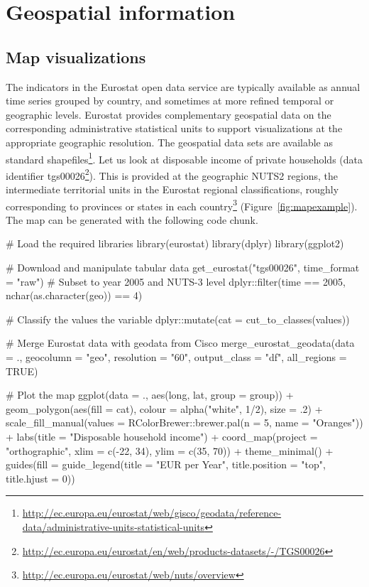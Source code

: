 \section{Geospatial information}

\subsection{Map visualizations}

The indicators in the Eurostat open data service are typically
available as annual time series grouped by country, and sometimes at
more refined temporal or geographic levels. Eurostat provides
complementary geospatial data on the corresponding administrative
statistical units to support visualizations at the appropriate
geographic resolution. The geospatial data sets are available as
standard shapefiles\footnote{\url{http://ec.europa.eu/eurostat/web/gisco/geodata/reference-data/administrative-units-statistical-units}}. Let
us look at disposable income of private households (data identifier
tgs00026\footnote{\url{http://ec.europa.eu/eurostat/en/web/products-datasets/-/TGS00026}}). This is provided at the geographic NUTS2 regions, the intermediate territorial units in the Eurostat regional classifications, roughly
corresponding to provinces or states in each country\footnote{\url{http://ec.europa.eu/eurostat/web/nuts/overview}} (Figure~\ref{fig:mapexample}). The map can be generated with the following code chunk.

\begin{example}
  # Load the required libraries
  library(eurostat)
  library(dplyr)
  library(ggplot2)

  # Download and manipulate tabular data
  get_eurostat("tgs00026", time_format = "raw") %
    # Subset to year 2005 and NUTS-3 level
    dplyr::filter(time == 2005, nchar(as.character(geo)) == 4) %

    # Classify the values the variable
    dplyr::mutate(cat = cut_to_classes(values)) %

    # Merge Eurostat data with geodata from Cisco
    merge_eurostat_geodata(data = ., geocolumn = "geo", resolution = "60",
                         output_class = "df", all_regions = TRUE) %

  # Plot the map
  ggplot(data = ., aes(long, lat, group = group)) +
    geom_polygon(aes(fill = cat), colour = alpha("white", 1/2), size = .2) +
    scale_fill_manual(values = RColorBrewer::brewer.pal(n = 5, name = "Oranges")) +
    labs(title = "Disposable household income") +
    coord_map(project = "orthographic", xlim = c(-22, 34), ylim = c(35, 70)) + theme_minimal() +
    guides(fill = guide_legend(title = "EUR per Year",
           title.position = "top", title.hjust = 0))
\end{example}


